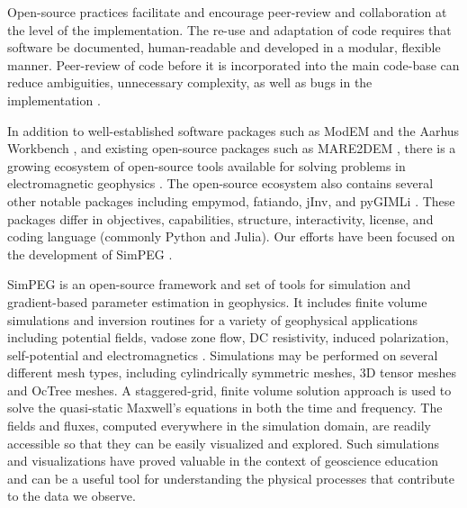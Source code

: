 \documentclass[paper]{geophysics}
\begin{document}
Open-source practices facilitate and encourage peer-review and collaboration at the level of the implementation. The re-use and adaptation of code requires that software be documented, human-readable and developed in a modular, flexible manner. Peer-review of code before it is incorporated into the main code-base can reduce ambiguities, unnecessary complexity, as well as bugs in the implementation \citep{Wilson2014}.

In addition to well-established software packages such as ModEM and the Aarhus Workbench \citep{Kelbert2014, Auken2015}, and existing open-source packages such as MARE2DEM \citep{Key2011}, there is a growing ecosystem of open-source tools available for solving problems in electromagnetic geophysics . The open-source ecosystem also contains several other notable packages including empymod, fatiando, jInv, and pyGIMLi \citep{Werthmuller2017, Uieda2013, Ruthotto2017, Rucker2017}. These packages differ in objectives, capabilities, structure, interactivity, license, and coding language (commonly Python and Julia). Our efforts have been focused on the development of SimPEG \citep{Cockett2015, Heagy2017}.

SimPEG is an open-source framework and set of tools for simulation and gradient-based parameter estimation in geophysics. It includes finite volume simulations and inversion routines for a variety of geophysical applications including potential fields, vadose zone flow, DC resistivity, induced polarization, self-potential and electromagnetics \citep{Cockett2015, kang2016, Heagy2017, Miller2017, Cockett2018, Miller2018, Witter2018}. Simulations may be performed on several different mesh types, including cylindrically symmetric meshes, 3D tensor meshes and OcTree meshes. A staggered-grid, finite volume solution approach is used to solve the quasi-static Maxwell’s equations in both the time and frequency. The fields and fluxes, computed everywhere in the simulation domain, are readily accessible so that they can be easily visualized and explored. Such simulations and visualizations have proved valuable in the context of geoscience education \citep{Oldenburg2017} and can be a useful tool for understanding the physical processes that contribute to the data we observe.
\end{document}
